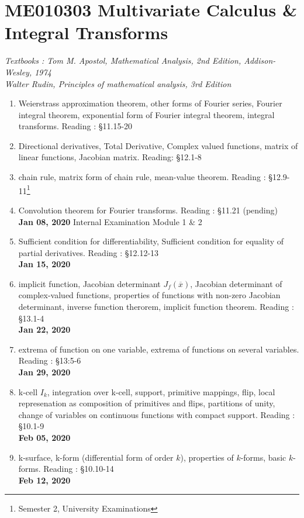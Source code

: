 \chapter{ME010303 Multivariate Calculus \& Integral Transforms}
\textit{Textbooks : Tom M. Apostol, Mathematical Analysis, 2nd Edition, Addison-Wesley, 1974\\Walter Rudin, Principles of mathematical analysis, 3rd Edition}
\begin{enumerate}[label=Week \arabic*]
	\item Weierstrass approximation theorem, other forms of Fourier series, Fourier integral theorem, exponential form of Fourier integral theorem, integral transforms. Reading : \S 11.15-20
	\item Directional derivatives, Total Derivative, Complex valued functions, matrix of linear functions, Jacobian matrix. Reading: \S 12.1-8
	\item chain rule, matrix form of chain rule, mean-value theorem. Reading : \S 12.9-11\footnote{Semester 2, University Examinations}
	\item Convolution theorem for Fourier transforms. Reading : \S 11.21 (pending)\\
		\textbf{Jan 08, 2020} Internal Examination Module 1 \& 2
	\item Sufficient condition for differentiability, Sufficient condition for equality of partial derivatives. Reading : \S 12.12-13\\
		\textbf{Jan 15, 2020}
	\item implicit function, Jacobian determinant $J_f(\overline{x})$, Jacobian determinant of complex-valued functions, properties of functions with non-zero Jacobian determinant, inverse function therorem, implicit function theorem. Reading : \S 13.1-4\\
		\textbf{Jan 22, 2020}
	\item extrema of function on one variable, extrema of functions on several variables. Reading : \S 13:5-6\\
		\textbf{Jan 29, 2020}
	\item k-cell $I_k$, integration over k-cell, support, primitive mappings, flip, local represenation as composition of primitives and flips, partitions of unity, change of variables on continuous functions with compact support.  Reading : \S 10.1-9\\
		\textbf{Feb 05, 2020}
	\item k-surface, k-form (differential form of order $k$), properties of $k$-forms, basic $k$-forms. Reading : \S 10.10-14\\
		\textbf{Feb 12, 2020}
\end{enumerate}
